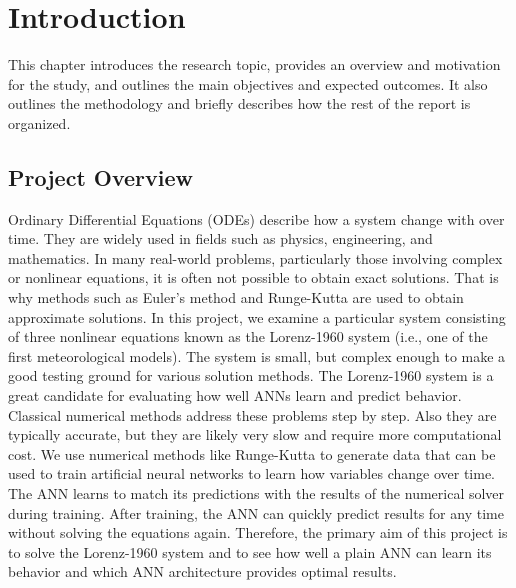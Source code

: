 \chapter{Introduction}

This chapter introduces the research topic, provides an overview and motivation for the study, and outlines the main objectives and expected outcomes. It also outlines the methodology and briefly describes how the rest of the report is organized.

\section{Project Overview}
Ordinary Differential Equations (ODEs) describe how a system change with over time. They are widely used in fields such as physics, engineering, and mathematics. In many 
real-world problems, particularly those involving complex or nonlinear equations, it is often 
not possible to obtain exact solutions. That is why methods such as Euler’s method and 
Runge-Kutta are used to obtain approximate solutions. In this project, we examine a 
particular system consisting of three nonlinear equations known as the Lorenz-1960 system 
(i.e., one of the first meteorological models). The system is small, but complex enough to 
make a good testing ground for various solution methods. The Lorenz-1960 system is a 
great candidate for evaluating how well ANNs learn and predict behavior. Classical 
numerical methods address these problems step by step. Also they are typically accurate, but 
they are likely very slow and require more computational cost. We use numerical methods like Runge-Kutta to generate data that can be used to train artificial neural networks to learn how variables change over time.
The ANN learns to match its predictions with the results of the numerical solver during training. After training, the ANN can quickly predict results for any time without solving the equations again.
Therefore, the primary aim  of this project is to solve the Lorenz-1960 system 
and to see how well a plain ANN can learn its behavior and which ANN architecture provides
optimal results. 


